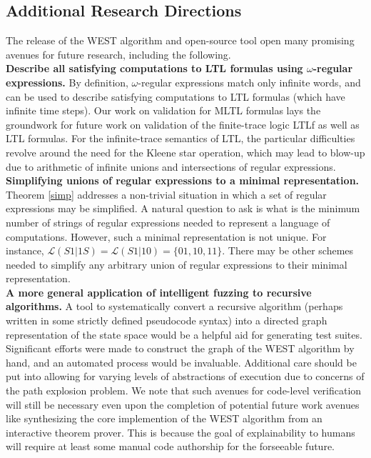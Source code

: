 \documentclass[runningheads]{llncs}
\begin{document}
\subsection{Additional Research Directions} The release of the WEST algorithm and open-source tool open many promising avenues for future research, including the following.\\
\textbf{Describe all satisfying computations to LTL formulas using $\omega$-regular expressions.}
By definition, $\omega$-regular expressions match only infinite words, and can be used to describe satisfying computations to LTL formulas (which have infinite time steps). 
Our work on validation for MLTL formulas lays the groundwork for future work on validation of the finite-trace logic LTLf \cite{GV13} as well as LTL formulas. For the infinite-trace semantics of LTL, the particular difficulties revolve around the need for the Kleene star operation, which may lead to blow-up due to arithmetic of infinite unions and intersections of regular expressions. \\
\noindent \textbf{Simplifying unions of regular expressions to a minimal representation.}
Theorem \ref{simp} addresses a non-trivial situation in which a set of regular expressions may be simplified. A natural question to ask is what is the minimum number of strings of regular expressions needed to represent a language of computations. However, such a minimal representation is not unique. For instance, $\mathscr{L}(S1|1S) = \mathscr{L}(S1|10) = \{01, 10, 11\}$. There may be other schemes needed to simplify any arbitrary union of regular expressions to their minimal representation.\\
\noindent \textbf{A more general application of intelligent fuzzing to recursive algorithms.}
A tool to systematically convert a recursive algorithm (perhaps written in some strictly defined pseudocode syntax) into a directed graph representation of the state space would be a helpful aid for generating test suites. 
Significant efforts were made to construct the graph of the WEST algorithm by hand, and an automated process would be invaluable. 
Additional care should be put into allowing for varying levels of abstractions of execution due to concerns of the path explosion problem. We note that such avenues for code-level verification will still be necessary even upon the completion of potential future work avenues like synthesizing the core implemention of the WEST algorithm from an interactive theorem prover. This is because the goal of explainability to humans will require at least some manual code authorship for the forseeable future.  \\
\end{document}
